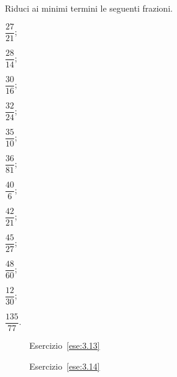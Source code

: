 \begin{esercizio}
 \label{ese:3.12}
Riduci ai minimi termini le seguenti frazioni.
 \begin{multicols}{6}
 \begin{enumeratea}
 \item $\dfrac{27}{21}$;\vspace{1.1ex}
 \item $\dfrac{28}{14}$;\vspace{1.1ex}
 \item $\dfrac{30}{16}$;
 \item $\dfrac{32}{24}$;\vspace{1.1ex}
 \item $\dfrac{35}{10}$;\vspace{1.1ex}
 \item $\dfrac{36}{81}$;
 \item $\dfrac{40}{6}$;\vspace{1.1ex}
 \item $\dfrac{42}{21}$;\vspace{1.1ex}
 \item $\dfrac{45}{27}$;
 \item $\dfrac{48}{60}$;\vspace{1.1ex}
 \item $\dfrac{12}{30}$;\vspace{1.1ex}
 \item $\dfrac{135}{77}$.
 \end{enumeratea}
 \end{multicols}
\end{esercizio}

\begin{figure}[t]
 \begin{minipage}[b]{.45\textwidth}
 \centering
 \caption{Esercizio~\ref{ese:3.13}}\label{fig:3.4}
 \end{minipage}\hfil
\begin{minipage}[b]{.45\textwidth}
 \centering
 \caption{Esercizio~\ref{ese:3.14}}\label{fig:3.5}
 \end{minipage}
\end{figure}

